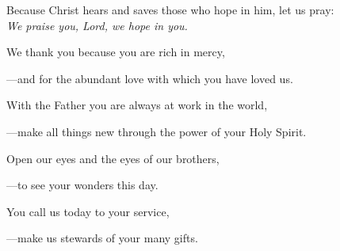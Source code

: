 \intercessions\indent

\begin{hangpar}

Because Christ hears and saves those who hope in him, let us pray:\\
\emph{We praise you, Lord, we hope in you.}

\medskip We thank you because you are rich in mercy,

{\color{red}---\thinspace}and for the abundant love with which you have loved us.

\medskip With the Father you are always at work in the world,

{\color{red}---\thinspace}make all things new through the power of your Holy Spirit.

\medskip Open our eyes and the eyes of our brothers,

{\color{red}---\thinspace}to see your wonders this day.

\medskip You call us today to your service,

{\color{red}---\thinspace}make us stewards of your many gifts.

\end{hangpar}

